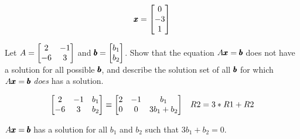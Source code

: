 \documentclass{../mathhomework}
\newenvironment{Mat}{\begin{bmatrix}}{\end{bmatrix}}
\begin{document}
\begin{problem}[1.4\#11]
\begin{solution}
        \begin{equation*}
            \Vect{x} = \begin{Mat}
                0 \\ -3 \\ 1
            \end{Mat}
        \end{equation*}
    \end{solution}
\end{problem}

\begin{problem}[1.4\#15]
    Let $A = \begin{Mat}
        2 & -1 \\
        -6 & 3
    \end{Mat}$ and $\Vect{b} = \begin{Mat}
        b_1 \\ b_2
    \end{Mat}$. Show that the equation $A\pmb{x} = \pmb{b}$ does not have a solution for all possible $\pmb{b}$, 
    and describe the solution set of all $\pmb{b}$ for which $A\pmb{x} = \pmb{b}$ \textit{does} has a solution.

    \begin{solution}
        \begin{align*}
            \begin{Mat}
                2 & -1 & b_1 \\
                -6 & 3 & b_2
            \end{Mat} & \equiv
            \begin{Mat}
                2 & -1 & b_1 \\
                0 & 0 & 3b_1 + b_2
            \end{Mat} & R2 = 3 * R1 + R2
        \end{align*}

        $A\pmb{x} = \pmb{b}$ has a solution for all $b_1$ and $b_2$ such that $3b_1 + b_2 = 0$.
    \end{solution}
\end{problem}
\end{document}
